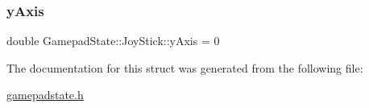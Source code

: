 \mbox{\label{struct_gamepad_state_1_1_joy_stick_ac270eec038132bdc0364968568df9516}} 
\subsubsection{\texorpdfstring{y\+Axis}{yAxis}}
{\footnotesize\ttfamily double Gamepad\+State\+::\+Joy\+Stick\+::y\+Axis = 0}



The documentation for this struct was generated from the following file\+:\begin{DoxyCompactItemize}
\item 
\mbox{\hyperlink{gamepadstate_8h}{gamepadstate.\+h}}\end{DoxyCompactItemize}
